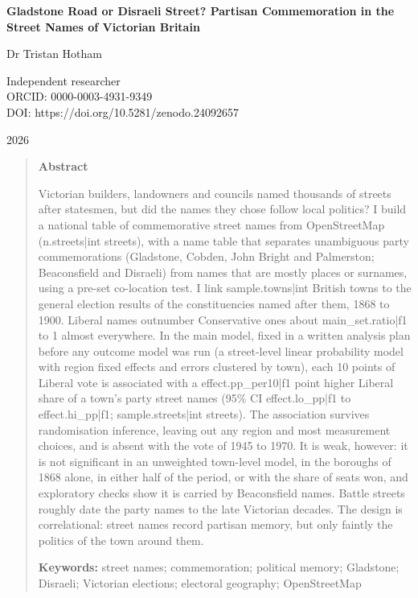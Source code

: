 \documentclass[11pt,a4paper]{article}
\begin{document}
\begin{center}
{\Large\bfseries Gladstone Road or Disraeli Street? Partisan Commemoration in the Street Names of Victorian Britain\par}
\vspace{1.2em}
{\large Dr Tristan Hotham\par}
\vspace{0.3em}
{\small Independent researcher\\
ORCID: 0000-0003-4931-9349\\
DOI: https://doi.org/10.5281/zenodo.24092657\par}
\vspace{0.8em}
2026
\end{center}

\begin{quote}
\small
\begin{center}\textbf{Abstract}\end{center}
Victorian builders, landowners and councils named thousands of streets after statesmen, but did the names they chose follow local politics? I build a national table of commemorative street names from OpenStreetMap ({{n.streets|int}} streets), with a name table that separates unambiguous party commemorations (Gladstone, Cobden, John Bright and Palmerston; Beaconsfield and Disraeli) from names that are mostly places or surnames, using a pre-set co-location test. I link {{sample.towns|int}} British towns to the general election results of the constituencies named after them, 1868 to 1900. Liberal names outnumber Conservative ones about {{main_set.ratio|f1}} to 1 almost everywhere. In the main model, fixed in a written analysis plan before any outcome model was run (a street-level linear probability model with region fixed effects and errors clustered by town), each 10 points of Liberal vote is associated with a {{effect.pp_per10|f1}} point higher Liberal share of a town's party street names (95\% CI {{effect.lo_pp|f1}} to {{effect.hi_pp|f1}}; {{sample.streets|int}} streets). The association survives randomisation inference, leaving out any region and most measurement choices, and is absent with the vote of 1945 to 1970. It is weak, however: it is not significant in an unweighted town-level model, in the boroughs of 1868 alone, in either half of the period, or with the share of seats won, and exploratory checks show it is carried by Beaconsfield names. Battle streets roughly date the party names to the late Victorian decades. The design is correlational: street names record partisan memory, but only faintly the politics of the town around them.

\textbf{Keywords:} street names; commemoration; political memory; Gladstone; Disraeli; Victorian elections; electoral geography; OpenStreetMap
\end{quote}
\end{document}
